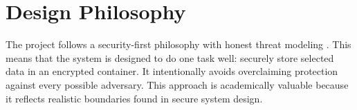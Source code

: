 \section{Design Philosophy}
The project follows a security-first philosophy with honest threat modeling \cite{mcgraw_software_security}. This means that the system is designed to do one task well: securely store selected data in an encrypted container. It intentionally avoids overclaiming protection against every possible adversary. This approach is academically valuable because it reflects realistic boundaries found in secure system design.
